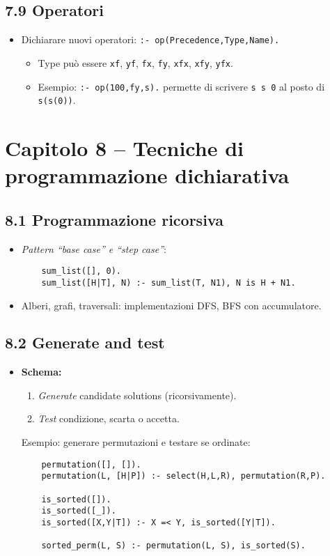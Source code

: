 \documentclass[12pt]{article}
\begin{document}
\subsection*{7.9 Operatori}

\begin{itemize}
  \item Dichiarare nuovi operatori: \texttt{:- op(Precedence,Type,Name).} \\
    \begin{itemize}
      \item Type può essere \texttt{xf}, \texttt{yf}, \texttt{fx}, \texttt{fy}, \texttt{xfx}, \texttt{xfy}, \texttt{yfx}.
      \item Esempio: \texttt{:- op(100,fy,s).} permette di scrivere \texttt{s s 0} al posto di \texttt{s(s(0))}.
    \end{itemize}
\end{itemize}

\section*{Capitolo 8 – Tecniche di programmazione dichiarativa}

\subsection*{8.1 Programmazione ricorsiva}

\begin{itemize}
  \item \emph{Pattern ``base case'' e ``step case''}:\newline
    \begin{verbatim}
    sum_list([], 0).
    sum_list([H|T], N) :- sum_list(T, N1), N is H + N1.
    \end{verbatim}
  \item Alberi, grafi, traversali: implementazioni DFS, BFS con accumulatore.
\end{itemize}

\subsection*{8.2 Generate and test}

\begin{itemize}
  \item \textbf{Schema:}
    \begin{enumerate}
      \item \emph{Generate} candidate solutions (ricorsivamente).
      \item \emph{Test} condizione, scarta o accetta.
    \end{enumerate}
    Esempio: generare permutazioni e testare se ordinate:
    \begin{verbatim}
    permutation([], []).
    permutation(L, [H|P]) :- select(H,L,R), permutation(R,P).

    is_sorted([]).
    is_sorted([_]).
    is_sorted([X,Y|T]) :- X =< Y, is_sorted([Y|T]).

    sorted_perm(L, S) :- permutation(L, S), is_sorted(S).
    \end{verbatim}
\end{itemize}
\end{document}
